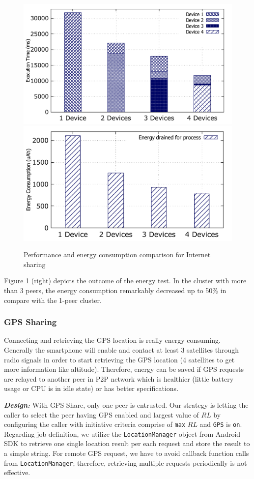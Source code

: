 \documentclass{sig-alternate}
\begin{document}
\begin{figure}
	\centering
		\includegraphics[width=.43\textwidth]{data/net_perf_01.pdf}
		\includegraphics[width=.46\textwidth]{data/net_energy.pdf}
	\caption{Performance and energy consumption comparison for Internet sharing}
	\label{fig:net_clusters_perf}
\end{figure}

Figure \ref{fig:net_clusters_perf} (right) depicts the outcome of the energy test. In the cluster with more than 3 peers, the energy consumption remarkably decreased up to 50\% in compare with the 1-peer cluster.

\subsubsection{GPS Sharing}
Connecting and retrieving the GPS location is really energy consuming. Generally the smartphone will enable and contact at least 3 satellites through radio signals in order to start retrieving the GPS location (4 satellites to get more information like altitude). Therefore, energy can be saved if GPS requests are relayed to another peer in P2P network which is healthier (little battery usage or CPU is in idle state) or has better specifications.

\textbf{\emph{Design:}}
With GPS Share, only one peer is entrusted. Our strategy is letting the caller to select the peer having GPS enabled and largest value of $RL$ by configuring the caller with initiative criteria comprise of \texttt{max} $RL$ and \texttt{GPS} is \texttt{on}. Regarding job definition, we utilize the \texttt{LocationManager} object from Android SDK to retrieve one single location result per each request and store the result to a simple string. For remote GPS request, we have to avoid callback function calls from \texttt{LocationManager}; therefore, retrieving multiple requests periodically is not effective.
\end{document}
